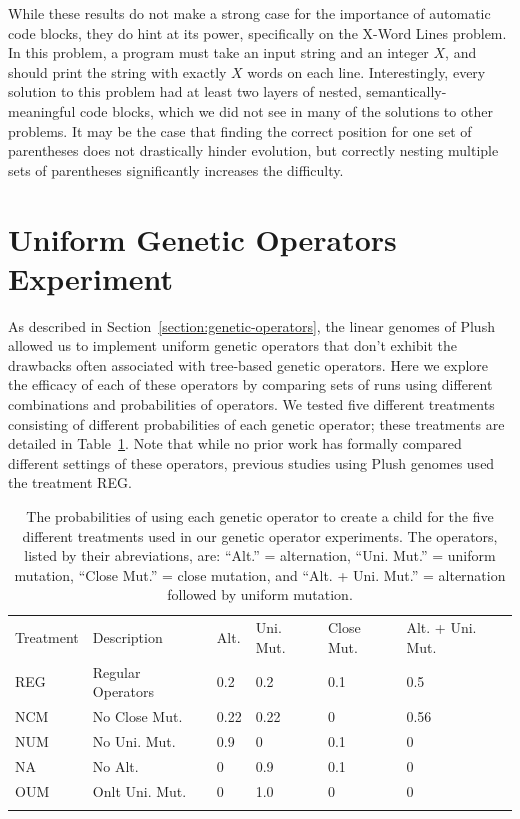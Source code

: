 \documentclass[graybox]{svmult}
\begin{document}
While these results do not make a strong case for the importance of automatic code blocks, they do hint at its power, specifically on the X-Word Lines problem. In this problem, a program must take an input string and an integer $X$, and should print the string with exactly $X$ words on each line. Interestingly, every solution to this problem had at least two layers of nested, semantically-meaningful code blocks, which we did not see in many of the solutions to other problems. It may be the case that finding the correct position for one set of parentheses does not drastically hinder evolution, but correctly nesting multiple sets of parentheses significantly increases the difficulty.


\section{Uniform Genetic Operators Experiment}

As described in Section~\ref{section:genetic-operators}, the linear genomes of Plush allowed us to implement uniform genetic operators that don't exhibit the 
drawbacks often associated with tree-based genetic operators. Here we explore the efficacy of each of these operators by comparing sets of runs using different combinations and probabilities of operators. We tested five different treatments consisting of different probabilities of each genetic operator; these treatments are detailed in Table~\ref{genetic-operator-combinations}. Note that while no prior work has formally compared different settings of these operators, previous studies using Plush genomes \cite{Helmuth:2015:GECCO, Helmuth:2015:GPTP, McPhee:2015:GPTP} used the treatment REG.

\begin{table}[t]
\centering
\caption{The probabilities of using each genetic operator to create a child for the five different treatments used in our genetic operator experiments. The operators, listed by their abreviations, are:
``Alt.'' = alternation,
``Uni. Mut.'' = uniform mutation,
``Close Mut.'' = close mutation, and
``Alt. + Uni. Mut.'' = alternation followed by uniform mutation.}
\label{genetic-operator-combinations}
\begin{tabular}{ll llll}
\hline\noalign{\smallskip}
Treatment & Description & Alt. & Uni. Mut. & Close Mut. & Alt. + Uni. Mut. \\
\noalign{\smallskip}\svhline\noalign{\smallskip}
REG & Regular Operators &  0.2 &  0.2 &  0.1 &  0.5  \\
NCM & No Close Mut.  &  0.22 &  0.22 &  0 &  0.56  \\
NUM & No Uni. Mut. &  0.9 &  0 &  0.1 &  0  \\
NA  & No Alt. &  0 &  0.9 &  0.1 &  0  \\
OUM & Onlt Uni. Mut. &  0 &  1.0 &  0 &  0  \\
\noalign{\smallskip}\hline\noalign{\smallskip}
\end{tabular}
\end{table}
\end{document}
